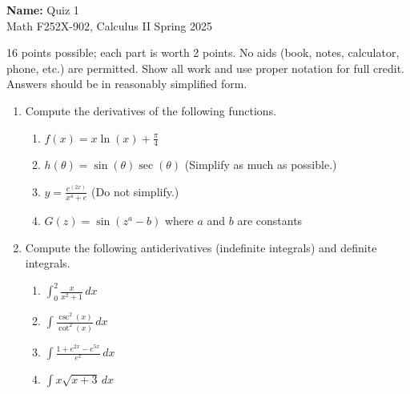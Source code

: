 \documentclass[12pt]{article}
\newcommand{\ds}{\displaystyle}
\begin{document}
\pagestyle{plain}

\noindent \textbf{Name:} \underline{\hspace{15em}}		\hfill	Quiz 1 \\
           Math F252X-902, Calculus II  			\hfill	Spring 2025 	

                \vspace{1cm}
                
16 points possible; each part is worth 2 points. No aids (book, notes,
calculator, phone, etc.) are permitted. Show all work and use proper
notation for full credit. Answers should be in reasonably simplified
form.

\begin{enumerate}
\item Compute the derivatives of the following functions.
  \begin{enumerate}
  \item $\ds f(x) = x \ln(x) + \frac{\pi}{4}$
    \vfill

  \item $\ds h(\theta) = \sin(\theta)\sec(\theta)$ (Simplify as much
    as possible.)
    \vfill

    \newpage

  \item $\ds y = \frac{e^{(2x)}}{x^4+e}$ (Do not simplify.)
    \vfill

  \item $\ds G(z) = \sin(z^a - b)$ where $a$ and $b$ are constants
    \vfill

  \end{enumerate}
  
  \newpage

\item Compute the following antiderivatives (indefinite integrals) and definite integrals.
  \begin{enumerate}
  \item $\ds \int_0^2 \frac{x}{x^2+1} \, dx$
    \vfill

  \item $\ds \int \frac{\csc^2(x)}{\cot^2(x)} \, dx$
    \vfill

    \newpage

  \item $\ds \int \frac{1+e^{2x}-e^{5x}}{e^{x}} \, dx$
    \vfill

  \item $\ds \int x \sqrt{x+3} \, dx$
    \vfill

  \end{enumerate}
  
    
    
\end{enumerate}
\end{document}
